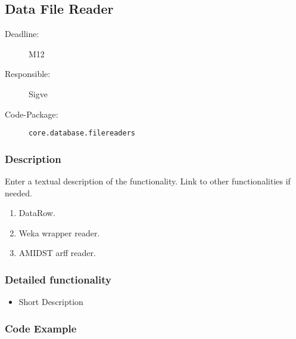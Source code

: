 \newpage
\subsection{Data File Reader}
\label{Functionality:ID}

\begin{description}
\item[Deadline:] M12
\item[Responsible:] Sigve
\item[Code-Package:] \texttt{core.database.filereaders}
\end{description}

\subsubsection*{Description}

Enter a textual description of the functionality. Link to other functionalities if needed. 

\begin{enumerate}
\item DataRow.
\item Weka wrapper reader.
\item AMIDST arff reader.
\end{enumerate}

\subsubsection*{Detailed functionality}

\begin{itemize}
\item Short Description
\end{itemize}

\subsubsection*{Code Example}

